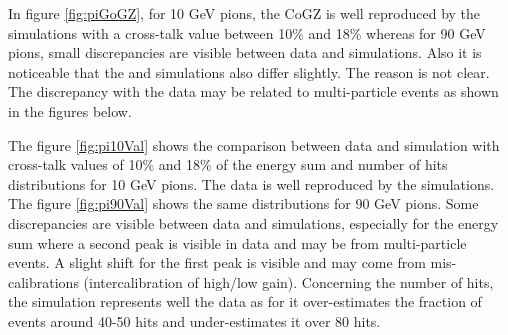 In figure \ref{fig:piGoGZ}, for 10 GeV pions, the CoGZ is well reproduced by the simulations with a cross-talk value between 10\% and 18\% whereas for 90 GeV pions, small discrepancies are visible between data and simulations. Also it is noticeable that the \ddhep and \mokka simulations also differ slightly. The reason is not clear. The discrepancy with the data may be related to multi-particle events as shown in the figures below.

The figure \ref{fig:pi10Val} shows the comparison between data and simulation with cross-talk values of 10\% and 18\% of the energy sum and number of hits distributions for 10 GeV pions. The data is well reproduced by the simulations. The figure \ref{fig:pi90Val} shows the same distributions for 90 GeV pions. Some discrepancies are visible between data and simulations, especially for the energy sum where a second peak is visible in data and may be from multi-particle events. A slight shift for the first peak is visible and may come from mis-calibrations (intercalibration of high/low gain). Concerning the number of hits, the \mokka simulation represents well the data as for \ddhep it over-estimates the fraction of events around 40-50 hits and under-estimates it over 80 hits.

